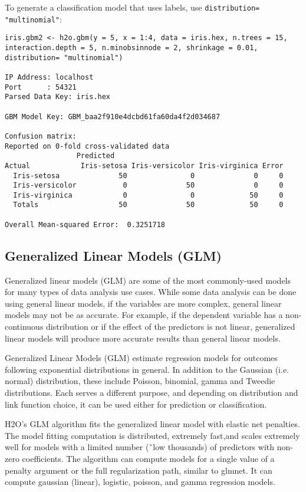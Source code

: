To generate a classification model that uses labels, use {\texttt{distribution= "multinomial"}}: 
\begin{lstlisting}[breaklines,basicstyle=\ttfamily]
iris.gbm2 <- h2o.gbm(y = 5, x = 1:4, data = iris.hex, n.trees = 15, interaction.depth = 5, n.minobsinnode = 2, shrinkage = 0.01, distribution= "multinomial")
   
IP Address: localhost 
Port      : 54321 
Parsed Data Key: iris.hex 

GBM Model Key: GBM_baa2f910e4dcbd61fa60da4f2d034687 

Confusion matrix:
Reported on 0-fold cross-validated data 
                 Predicted
Actual            Iris-setosa Iris-versicolor Iris-virginica Error
  Iris-setosa              50               0              0     0
  Iris-versicolor           0              50              0     0
  Iris-virginica            0               0             50     0
  Totals                   50              50             50     0

Overall Mean-squared Error:  0.3251718 
\end{lstlisting}

\subsection{Generalized Linear Models (GLM)}


Generalized linear models (GLM) are some of the most commonly-used models for many types of data analysis use cases. While some data analysis can be done using general linear models, if the variables are more complex, general linear models may not be as accurate. For example, if the dependent variable has a non-continuous distribution or if the effect of the predictors is not linear, generalized linear models will produce more accurate results than general linear models.  

Generalized Linear Models (GLM) estimate regression models for outcomes following exponential distributions in general. In addition to the Gaussian (i.e. normal) distribution, these include Poisson, binomial, gamma and Tweedie distributions. Each serves a different purpose, and depending on distribution and link function choice, it can be used either for prediction or classification.

H2O's GLM algorithm fits the generalized linear model with elastic net penalties. The model fitting computation is distributed, extremely fast,and scales extremely well for models with a limited number (\~\ low thousands) of predictors with non-zero coefficients. The algorithm can compute models for a single value of a penalty argument or the full regularization path, similar to glmnet. It can compute gaussian (linear), logistic, poisson, and gamma regression models.


